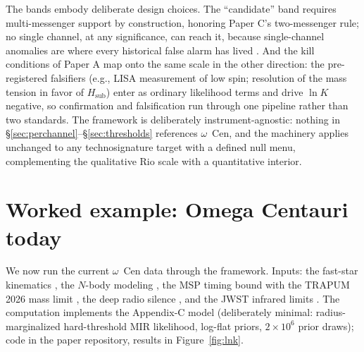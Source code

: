 \documentclass[11pt]{article}
\newcommand{\ocen}{\ensuremath{\omega}~Cen}
\newcommand{\lnK}{\ensuremath{\ln K}}
\newcommand{\Hsub}{\ensuremath{H_{\mathrm{sub}}}}
\begin{document}
The bands embody deliberate design choices. The ``candidate'' band requires multi-messenger support by construction, honoring Paper C's two-messenger rule; no single channel, at any significance, can reach it, because single-channel anomalies are where every historical false alarm has lived \citep{Sheikh2021}. And the kill conditions of Paper A map onto the same scale in the other direction: the pre-registered falsifiers (e.g., LISA measurement of low spin; resolution of the mass tension in favor of \Hsub) enter as ordinary likelihood terms and drive \lnK{} negative, so confirmation and falsification run through one pipeline rather than two standards. The framework is deliberately instrument-agnostic: nothing in \S\ref{sec:perchannel}--\S\ref{sec:thresholds} references \ocen, and the machinery applies unchanged to any technosignature target with a defined null menu, complementing the qualitative Rio scale \citep{Forgan2018} with a quantitative interior.

\section{Worked example: Omega Centauri today}
\label{sec:worked}

We now run the current \ocen{} data through the framework. Inputs: the fast-star kinematics \citep{Haberle2024Nature}, the $N$-body modeling \citep{GonzalezPrieto2025}, the MSP timing bound \citep{BanaresHernandez2025} with the TRAPUM 2026 mass limit \citep{ColomiBernadich2026}, the deep radio silence \citep{Mahida2026,Tremou2018}, and the JWST infrared limits \citep{Chen2025JWST}. The computation implements the Appendix-C model (deliberately minimal: radius-marginalized hard-threshold MIR likelihood, log-flat priors, $2\times10^{6}$ prior draws); code in the paper repository, results in Figure~\ref{fig:lnk}.
\end{document}
